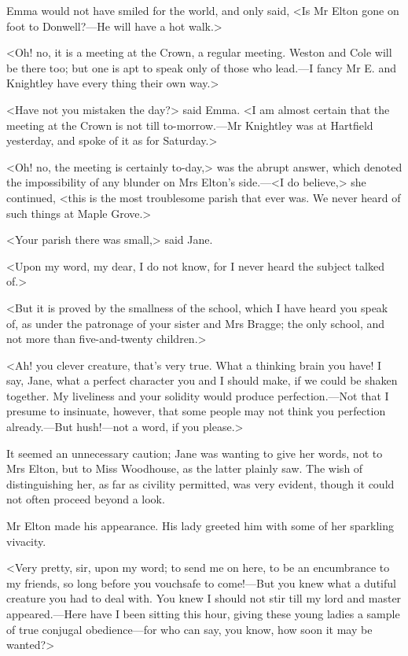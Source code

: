 Emma would not have smiled for the world, and only said, <Is Mr Elton gone on foot to Donwell?—He will have a hot walk.>

<Oh! no, it is a meeting at the Crown, a regular meeting. Weston and Cole will be there too; but one is apt to speak only of those who lead.—I fancy Mr E. and Knightley have every thing their own way.>

<Have not you mistaken the day?> said Emma. <I am almost certain that the meeting at the Crown is not till to-morrow.—Mr Knightley was at Hartfield yesterday, and spoke of it as for Saturday.>

<Oh! no, the meeting is certainly to-day,> was the abrupt answer, which denoted the impossibility of any blunder on Mrs Elton's side.—<I do believe,> she continued, <this is the most troublesome parish that ever was. We never heard of such things at Maple Grove.>

<Your parish there was small,> said Jane.

<Upon my word, my dear, I do not know, for I never heard the subject talked of.>

<But it is proved by the smallness of the school, which I have heard you speak of, as under the patronage of your sister and Mrs Bragge; the only school, and not more than five-and-twenty children.>

<Ah! you clever creature, that's very true. What a thinking brain you have! I say, Jane, what a perfect character you and I should make, if we could be shaken together. My liveliness and your solidity would produce perfection.—Not that I presume to insinuate, however, that some people may not think you perfection already.—But hush!—not a word, if you please.>

It seemed an unnecessary caution; Jane was wanting to give her words, not to Mrs Elton, but to Miss Woodhouse, as the latter plainly saw. The wish of distinguishing her, as far as civility permitted, was very evident, though it could not often proceed beyond a look.

Mr Elton made his appearance. His lady greeted him with some of her sparkling vivacity.

<Very pretty, sir, upon my word; to send me on here, to be an encumbrance to my friends, so long before you vouchsafe to come!—But you knew what a dutiful creature you had to deal with. You knew I should not stir till my lord and master appeared.—Here have I been sitting this hour, giving these young ladies a sample of true conjugal obedience—for who can say, you know, how soon it may be wanted?>

